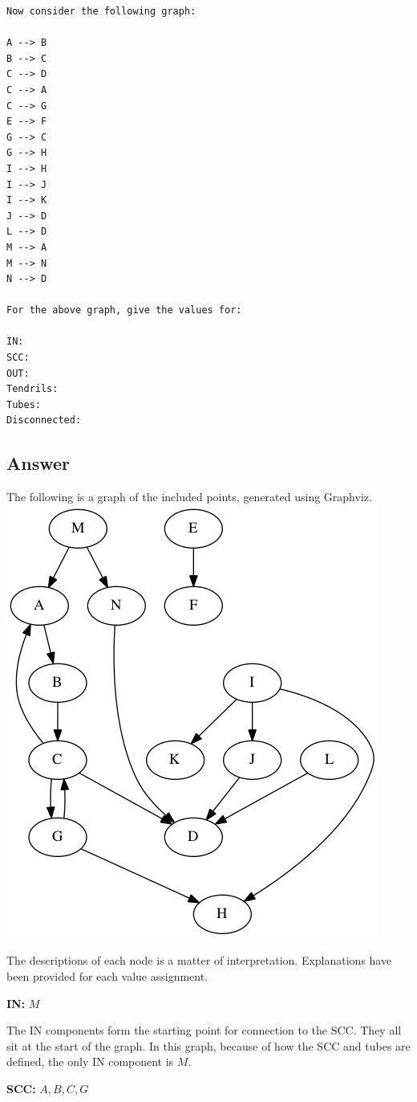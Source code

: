 \documentclass[letterpaper,11pt]{article}
\begin{document}
{\begin{verbatim}
Now consider the following graph:

A --> B
B --> C
C --> D
C --> A
C --> G
E --> F
G --> C
G --> H
I --> H
I --> J
I --> K
J --> D 
L --> D
M --> A
M --> N
N --> D
    
For the above graph, give the values for:

IN: 
SCC: 
OUT: 
Tendrils: 
Tubes: 
Disconnected:
\end{verbatim}

\subsection*{Answer}
The following is a graph of the included points, generated using Graphviz.
\includegraphics[scale=0.5]{work/q3.png}

The descriptions of each node is a matter of interpretation.  Explanations have been provided for each value assignment.

\textbf{IN:}  $M$

The IN components form the starting point for connection to the SCC.  They all sit at the start of the graph.  In this graph, because of how the SCC and tubes are defined, the only IN component is $M$.

\textbf{SCC:}  $A, B, C, G$

}
\end{document}
